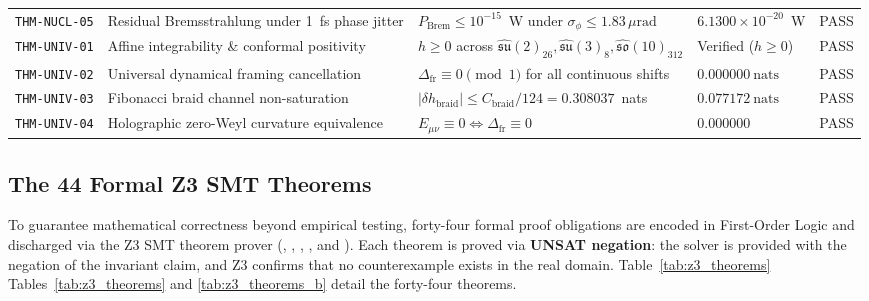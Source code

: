 \documentclass[11pt,onecolumn]{article}
\begin{document}
\begin{table}[!htbp]
\begin{tabularx}{\textwidth}{@{}l p{4.6cm} p{4.0cm} p{2.6cm} c@{}}
\texttt{THM-NUCL-05} & Residual Bremsstrahlung under 1~fs phase jitter & $P_{\text{Brem}} \le 10^{-15}$~W under $\sigma_\phi \le 1.83\,\mu\text{rad}$ & $6.1300\times 10^{-20}$~W & PASS \\
\texttt{THM-UNIV-01} & Affine integrability \& conformal positivity & $h \ge 0$ across $\hat{\mathfrak{su}}(2)_{26}, \hat{\mathfrak{su}}(3)_8, \hat{\mathfrak{so}}(10)_{312}$ & Verified ($h \ge 0$) & PASS \\
\texttt{THM-UNIV-02} & Universal dynamical framing cancellation & $\Delta_{\text{fr}} \equiv 0 \pmod 1$ for all continuous shifts & $0.000000~\text{nats}$ & PASS \\
\texttt{THM-UNIV-03} & Fibonacci braid channel non-saturation & $|\delta h_{\text{braid}}| \le C_{\text{braid}}/124 = 0.308037$~nats & $0.077172~\text{nats}$ & PASS \\
\texttt{THM-UNIV-04} & Holographic zero-Weyl curvature equivalence & $E_{\mu\nu} \equiv 0 \iff \Delta_{\text{fr}} \equiv 0$ & $0.000000$ & PASS \\
\bottomrule
\end{tabularx}
\end{table}

\FloatBarrier
\subsection{The 44 Formal Z3 SMT Theorems}
To guarantee mathematical correctness beyond empirical testing, forty-four formal proof obligations are encoded in First-Order Logic and discharged via the Z3 SMT theorem prover (, , , , and ). Each theorem is proved via \textbf{UNSAT negation}: the solver is provided with the negation of the invariant claim, and Z3 confirms that no counterexample exists in the real domain. Table~\ref{tab:z3_theorems} Tables~\ref{tab:z3_theorems} and \ref{tab:z3_theorems_b} detail the forty-four theorems.
\end{document}
